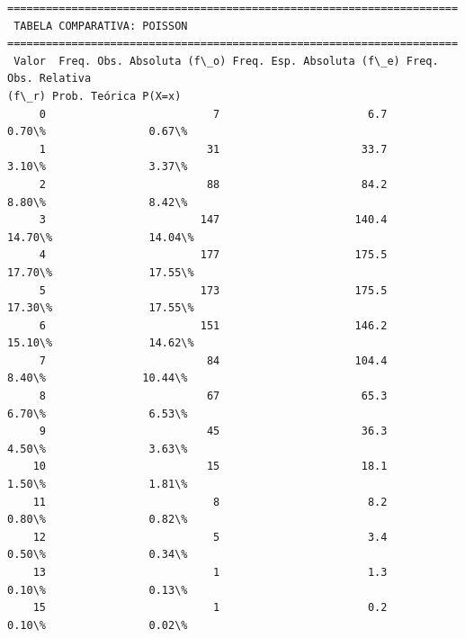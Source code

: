 \documentclass[11pt]{article}
\begin{document}
\begin{Verbatim}[commandchars=\\\{\}]
======================================================================
 TABELA COMPARATIVA: POISSON
======================================================================
 Valor  Freq. Obs. Absoluta (f\_o) Freq. Esp. Absoluta (f\_e) Freq. Obs. Relativa
(f\_r) Prob. Teórica P(X=x)
     0                          7                       6.7
0.70\%                0.67\%
     1                         31                      33.7
3.10\%                3.37\%
     2                         88                      84.2
8.80\%                8.42\%
     3                        147                     140.4
14.70\%               14.04\%
     4                        177                     175.5
17.70\%               17.55\%
     5                        173                     175.5
17.30\%               17.55\%
     6                        151                     146.2
15.10\%               14.62\%
     7                         84                     104.4
8.40\%               10.44\%
     8                         67                      65.3
6.70\%                6.53\%
     9                         45                      36.3
4.50\%                3.63\%
    10                         15                      18.1
1.50\%                1.81\%
    11                          8                       8.2
0.80\%                0.82\%
    12                          5                       3.4
0.50\%                0.34\%
    13                          1                       1.3
0.10\%                0.13\%
    15                          1                       0.2
0.10\%                0.02\%
    \end{Verbatim}


    
    
    
\end{document}
